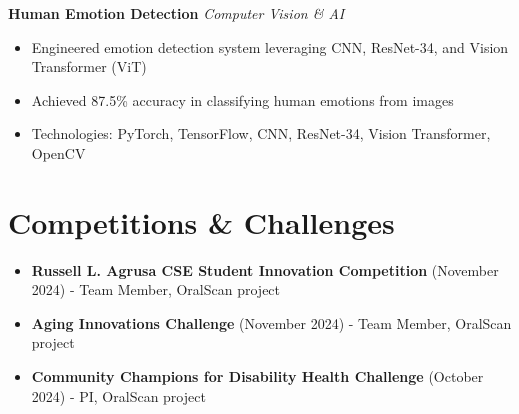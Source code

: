 \documentclass[11pt,a4paper]{article}
\begin{document}
\noindent
\textbf{Human Emotion Detection} \hfill \textit{Computer Vision \& AI}
\noindent
\begin{itemize}[nosep]
    \item Engineered emotion detection system leveraging CNN, ResNet-34, and Vision Transformer (ViT)
    \item Achieved 87.5\% accuracy in classifying human emotions from images
    \item Technologies: PyTorch, TensorFlow, CNN, ResNet-34, Vision Transformer, OpenCV
\end{itemize}




\section*{Competitions \& Challenges}
\noindent
\begin{itemize}[nosep]
    \item \textbf{Russell L. Agrusa CSE Student Innovation Competition} (November 2024) - Team Member, OralScan project
    \item \textbf{Aging Innovations Challenge} (November 2024) - Team Member, OralScan project
    \item \textbf{Community Champions for Disability Health Challenge} (October 2024) - PI, OralScan project
\end{itemize}
\end{document}
